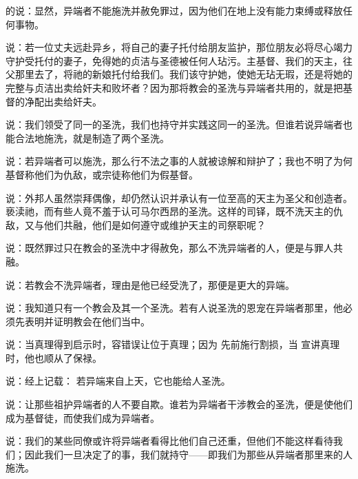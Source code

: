 的说：显然，异端者不能施洗并赦免罪过，因为他们在地上没有能力束缚或释放任何事物。\par

 说：若一位丈夫远赴异乡，将自己的妻子托付给朋友监护，那位朋友必将尽心竭力守护受托付的妻子，免得她的贞洁与圣德被任何人玷污。主基督、我们的天主，往父那里去了，将祂的新娘托付给我们。我们该守护她，使她无玷无瑕，还是将她的完整与贞洁出卖给奸夫和败坏者？因为那将教会的圣洗与异端者共用的，就是把基督的净配出卖给奸夫。\par

 说：我们领受了同一的圣洗，我们也持守并实践这同一的圣洗。但谁若说异端者也能合法地施洗，就是制造了两个圣洗。\par

 说：若异端者可以施洗，那么行不法之事的人就被谅解和辩护了；我也不明了为何基督称他们为仇敌，或宗徒称他们为假基督。\par

 说：外邦人虽然崇拜偶像，却仍然认识并承认有一位至高的天主为圣父和创造者。 亵渎祂，而有些人竟不羞于认可马尔西昂的圣洗。这样的司铎，既不洗天主的仇敌，又与他们共融，他们是如何遵守或维护天主的司祭职呢？\par

 说：既然罪过只在教会的圣洗中才得赦免，那么不洗异端者的人，便是与罪人共融。\par

 说：若教会不洗异端者，理由是他已经受洗了，那便是更大的异端。\par

 说：我知道只有一个教会及其一个圣洗。若有人说圣洗的恩宠在异端者那里，他必须先表明并证明教会在他们当中。\par

 说：当真理得到启示时，容错误让位于真理；因为 先前施行割损，当 宣讲真理时，他也顺从了保禄。\par

 说：经上记载： 若异端来自上天，它也能给人圣洗。\par

 说：让那些祖护异端者的人不要自欺。谁若为异端者干涉教会的圣洗，便是使他们成为基督徒，而使我们成为异端者。\par

 说：我们的某些同僚或许将异端者看得比他们自己还重，但他们不能这样看待我们；因此我们一旦决定了的事，我们就持守——即我们为那些从异端者那里来的人施洗。\par

